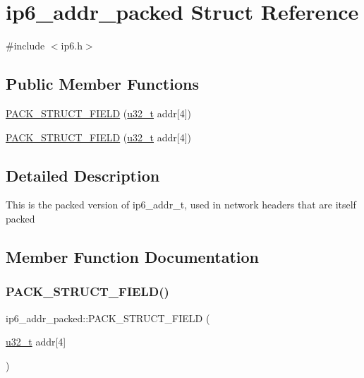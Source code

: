 \hypertarget{structip6__addr__packed}{}\section{ip6\+\_\+addr\+\_\+packed Struct Reference}
\label{structip6__addr__packed}


{\ttfamily \#include $<$ip6.\+h$>$}

\subsection*{Public Member Functions}
\begin{DoxyCompactItemize}
\item 
\hyperlink{structip6__addr__packed_a9d7cd2a55e5e416dec8a98f4cd495a55}{P\+A\+C\+K\+\_\+\+S\+T\+R\+U\+C\+T\+\_\+\+F\+I\+E\+LD} (\hyperlink{group__compiler__abstraction_ga4c14294869aceba3ef9d4c0c302d0f33}{u32\+\_\+t} addr\mbox{[}4\mbox{]})
\item 
\hyperlink{structip6__addr__packed_a9d7cd2a55e5e416dec8a98f4cd495a55}{P\+A\+C\+K\+\_\+\+S\+T\+R\+U\+C\+T\+\_\+\+F\+I\+E\+LD} (\hyperlink{group__compiler__abstraction_ga4c14294869aceba3ef9d4c0c302d0f33}{u32\+\_\+t} addr\mbox{[}4\mbox{]})
\end{DoxyCompactItemize}


\subsection{Detailed Description}
This is the packed version of ip6\+\_\+addr\+\_\+t, used in network headers that are itself packed 

\subsection{Member Function Documentation}
\mbox{\label{structip6__addr__packed_a9d7cd2a55e5e416dec8a98f4cd495a55}} 
\subsubsection{\texorpdfstring{P\+A\+C\+K\+\_\+\+S\+T\+R\+U\+C\+T\+\_\+\+F\+I\+E\+L\+D()}{PACK\_STRUCT\_FIELD()}\hspace{0.1cm}{\footnotesize\ttfamily [1/2]}}
{\footnotesize\ttfamily ip6\+\_\+addr\+\_\+packed\+::\+P\+A\+C\+K\+\_\+\+S\+T\+R\+U\+C\+T\+\_\+\+F\+I\+E\+LD (\begin{DoxyParamCaption}\item[{\hyperlink{group__compiler__abstraction_ga4c14294869aceba3ef9d4c0c302d0f33}{u32\+\_\+t}}]{addr\mbox{[}4\mbox{]} }\end{DoxyParamCaption})}

